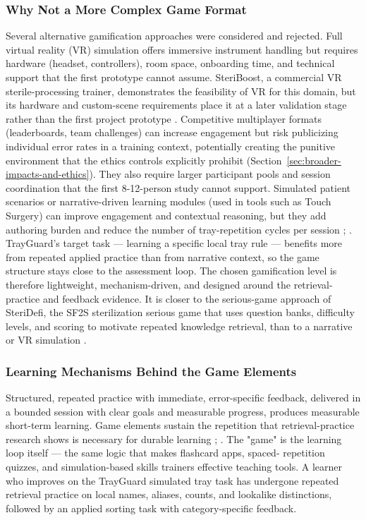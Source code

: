 \documentclass[10pt,a4paper]{article}
\begin{document}
\subsubsection{Why Not a More Complex Game Format}

Several alternative gamification approaches were considered and rejected.
Full virtual reality (VR) simulation offers immersive instrument handling but
requires hardware (headset, controllers), room space, onboarding time, and
technical support that the first prototype cannot assume. SteriBoost, a
commercial VR sterile-processing trainer, demonstrates the feasibility of VR
for this domain, but its hardware and custom-scene requirements place it at a
later validation stage rather than the first project prototype
\cite{steriboost-accessed-2026}.
Competitive multiplayer formats (leaderboards, team challenges) can increase
engagement but risk publicizing individual error rates in a training context,
potentially creating the punitive environment that the ethics controls
explicitly prohibit (Section~\ref{sec:broader-impacts-and-ethics}). They also require larger participant pools
and session coordination that the first 8-12-person study cannot support.
Simulated patient scenarios or narrative-driven learning modules (used in tools
such as Touch Surgery) can improve engagement and contextual reasoning, but
they add authoring burden and reduce the number of tray-repetition cycles per
session \cite{tulipan-et-al-2019};
\cite{medtronic-touch-surgery-accessed-2026}.
TrayGuard's target task — learning a specific local tray rule — benefits more
from repeated applied practice than from narrative context, so the game
structure stays close to the assessment loop.
The chosen gamification level is therefore lightweight, mechanism-driven, and
designed around the retrieval-practice and feedback evidence. It is closer to
the serious-game approach of SteriDefi, the SF2S sterilization serious game
that uses question banks, difficulty levels, and scoring to motivate repeated
knowledge retrieval, than to a narrative or VR simulation
\cite{vanhaverbeke-et-al-2018}.
\subsubsection{Learning Mechanisms Behind the Game Elements}

Structured, repeated practice with immediate, error-specific feedback,
delivered in a bounded session with clear goals and measurable progress,
produces measurable short-term learning. Game elements sustain the repetition
that retrieval-practice research shows is necessary for durable learning
\cite{roediger-and-karpicke-2006};
\cite{dunlosky-et-al-2013}. The "game" is the
learning loop itself — the same logic that makes flashcard apps, spaced-
repetition quizzes, and simulation-based skills trainers effective teaching
tools. A learner who improves on the TrayGuard simulated tray task has
undergone repeated retrieval practice on local names, aliases, counts, and
lookalike distinctions, followed by an applied sorting task with
category-specific feedback.
\end{document}
